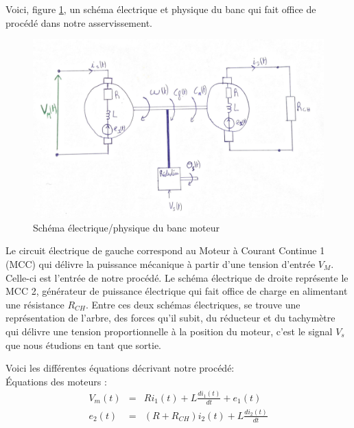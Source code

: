 Voici, figure \ref{fig:schema0}, un schéma électrique et physique du banc qui fait office de procédé dans notre asservissement.
\begin{figure}[!ht]
\centering
\includegraphics[width=.8\textwidth]{./I/images/schema0.png}
\caption{\label{fig:schema0}Schéma électrique/physique du banc moteur}
\end{figure}
Le circuit électrique de gauche correspond au Moteur à Courant Continue 1 (MCC) qui délivre la puissance mécanique à partir d'une tension d'entrée $V_M$. Celle-ci est l'entrée de notre procédé. Le schéma électrique de droite représente le MCC 2, générateur de puissance électrique qui fait office de charge en alimentant une résistance $R_{CH}$. Entre ces deux schémas électriques, se trouve une représentation de l'arbre, des forces qu'il subit, du réducteur et du tachymètre qui délivre une tension proportionnelle à la position du moteur, c'est le signal $V_s$ que nous étudions en tant que sortie. 


Voici les différentes équations décrivant notre procédé:\\
\noindent\hspace{3mm}\textbullet  \hspace{1mm} Équations des moteurs :
\begin{eqnarray}
V_m(t)  					&=& 	R i_1(t) + L \frac{d   i_1(t)}{d t} + e_1(t) \\
e_2(t) 						&=& 	(R+R_{CH}) i_2(t) + L \frac{d i_2(t)}{d t}
\end{eqnarray}

